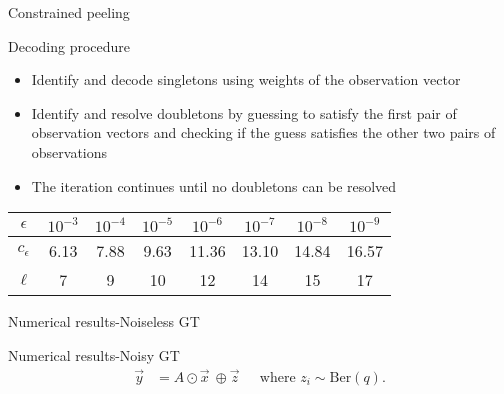\begin{frame}{Constrained peeling}
\begin{block}{Decoding procedure}
\begin{itemize}
\item  Identify and decode singletons using weights of the observation vector
\item Identify and resolve doubletons by guessing to satisfy the first pair of observation vectors and checking if the guess satisfies the other two pairs of observations
\item The iteration continues until no doubletons can be resolved
\end{itemize}
\end{block}
\vspace{10ex}
\centering
\begin{tabular}{| c | c | c | c | c | c | c | c | }
\hline
$\epsilon$ & $10^{-3}$ & $10^{-4}$ & $10^{-5}$ & $10^{-6}$ &$ 10^{-7}$ & $10^{-8}$ & $10^{-9}$ \\ \hline
$c_\epsilon$ & 6.13 & 7.88 & 9.63 & 11.36 & 13.10 & 14.84 & 16.57 \\ \hline
 $\ell$ & 7 & 9 & 10 & 12 & 14 & 15 & 17 \\ \hline
\end{tabular}

\end{frame}

%

\begin{frame}{Numerical results-Noiseless GT}
\centering
\resizebox{0.6\textwidth}{!}{}
\end{frame}

\begin{frame}{Numerical results-Noisy GT}
\vspace{-1ex}
\begin{align*}
\vec{y}&=A\odot \vec{x} ~\oplus \vec{z}~~\quad	\text{where } z_i\sim \text{Ber}(q).
\end{align*}

\centering
\resizebox{0.6\textwidth}{!}{}
\end{frame}